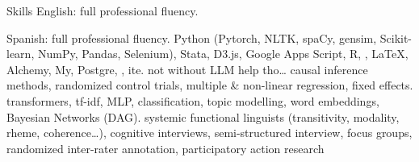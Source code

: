 
\begin{rubric}{Skills}
\entry*[Languages]
	English: full professional fluency. \par Spanish: full professional fluency.
	Python (Pytorch, NLTK, spaCy, gensim, Scikit-learn, NumPy, Pandas, Selenium), Stata, D3.js, Google Apps Script, R, , \LaTeX, 
\entry*[Databases]
	Alchemy, My, Postgre, , ite. \tiny{not without LLM help tho\ldots}
	causal inference methods, randomized control trials, multiple \& non-linear regression, fixed effects.
	transformers, tf-idf, MLP, classification, topic modelling, word embeddings, Bayesian Networks (DAG).
	systemic functional linguists (transitivity, modality, rheme, coherence\ldots), cognitive interviews, semi-structured interview, focus groups, randomized inter-rater annotation, participatory action research
\end{rubric}
